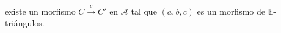 \documentclass[preview]{standalone}
\begin{document}
\begin{center}
existe un morfismo $C\xrightarrow{c}C'$ en $\mathscr{A}$ tal que $(a,b,c)$ es un morfismo de $\mathbb{E}$-triángulos.
\end{center}
\end{document}
